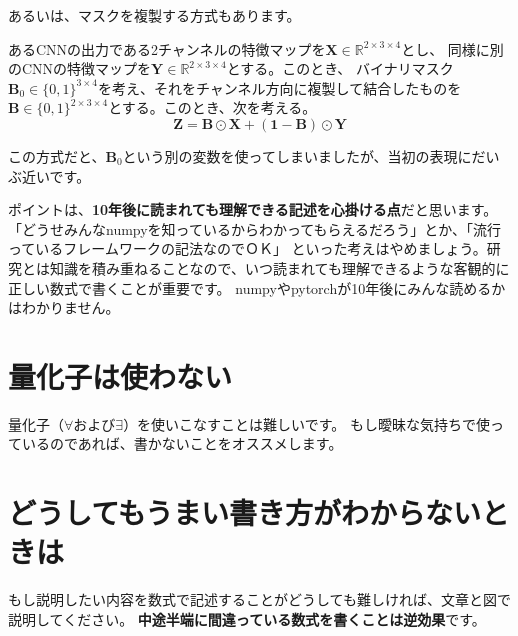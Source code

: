 \documentclass[uplatex,twocolumn,9pt,dvipdfmx]{jsarticle}
\begin{document}
あるいは、マスクを複製する方式もあります。
\begin{screen}
あるCNNの出力である2チャンネルの特徴マップを$\mathbf{X}\in\mathbb{R}^{2 \times3 \times 4}$とし、
同様に別のCNNの特徴マップを$\mathbf{Y}\in\mathbb{R}^{2\times 3\times 4}$とする。このとき、
バイナリマスク$\mathbf{B}_0\in\{0, 1\}^{3\times 4}$を考え、それをチャンネル方向に複製して結合したものを
$\mathbf{B}\in\{0, 1\}^{2 \times 3\times 4}$とする。このとき、次を考える。
\begin{equation}
    \mathbf{Z} = \mathbf{B} \odot \mathbf{X} + (\mathbf{1} - \mathbf{B}) \odot \mathbf{Y}
\end{equation}
\end{screen}
この方式だと、$\mathbf{B}_0$という別の変数を使ってしまいましたが、当初の表現にだいぶ近いです。

ポイントは、\textbf{10年後に読まれても理解できる記述を心掛ける点}だと思います。
「どうせみんなnumpyを知っているからわかってもらえるだろう」とか、「流行っているフレームワークの記法なのでＯＫ」
といった考えはやめましょう。研究とは知識を積み重ねることなので、いつ読まれても理解できるような客観的に正しい数式で書くことが重要です。
numpyやpytorchが10年後にみんな読めるかはわかりません。





\section{量化子は使わない}
量化子（$\forall および \exists$）を使いこなすことは難しいです。
もし曖昧な気持ちで使っているのであれば、書かないことをオススメします。


\section{どうしてもうまい書き方がわからないときは}
もし説明したい内容を数式で記述することがどうしても難しければ、文章と図で説明してください。
\textbf{中途半端に間違っている数式を書くことは逆効果}です。
\end{document}

